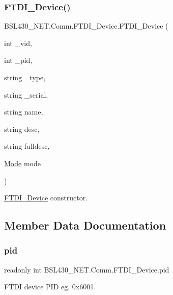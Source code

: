 \subsubsection{\texorpdfstring{FTDI\_Device()}{FTDI\_Device()}}
{\footnotesize\ttfamily B\+S\+L430\+\_\+\+N\+E\+T.\+Comm.\+F\+T\+D\+I\+\_\+\+Device.\+F\+T\+D\+I\+\_\+\+Device (\begin{DoxyParamCaption}\item[{int}]{\+\_\+vid,  }\item[{int}]{\+\_\+pid,  }\item[{string}]{\+\_\+type,  }\item[{string}]{\+\_\+serial,  }\item[{string}]{name,  }\item[{string}]{desc,  }\item[{string}]{fulldesc,  }\item[{\mbox{\hyperlink{namespace_b_s_l430___n_e_t_aa1c6981cb6f279b5491d861ca555a1d7}{Mode}}}]{mode }\end{DoxyParamCaption})}



\mbox{\hyperlink{class_b_s_l430___n_e_t_1_1_comm_1_1_f_t_d_i___device}{F\+T\+D\+I\+\_\+\+Device}} constructor. 



\subsection{Member Data Documentation}
\mbox{\label{class_b_s_l430___n_e_t_1_1_comm_1_1_f_t_d_i___device_a1c024783d6837f9a2a4e2d01690fdab5}} 
\subsubsection{\texorpdfstring{pid}{pid}}
{\footnotesize\ttfamily readonly int B\+S\+L430\+\_\+\+N\+E\+T.\+Comm.\+F\+T\+D\+I\+\_\+\+Device.\+pid}



F\+T\+DI device P\+ID eg. 0x6001. 

\mbox{\label{class_b_s_l430___n_e_t_1_1_comm_1_1_f_t_d_i___device_a44f740e3b911a3e6b0b2f2f73b2da1b9}} 
